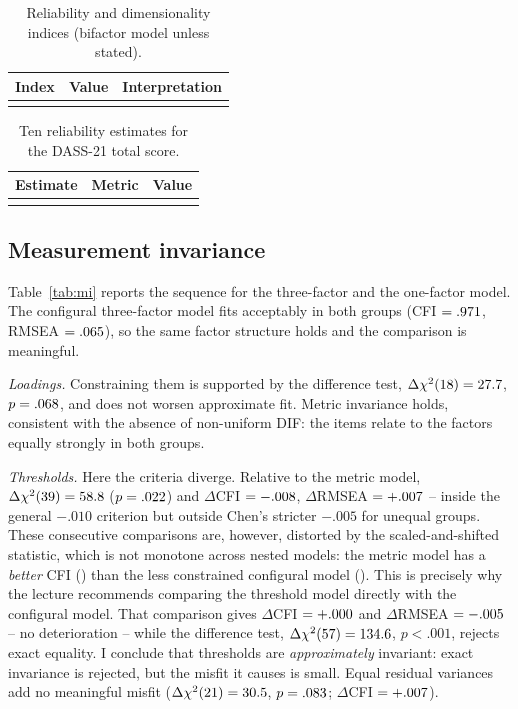 \documentclass[11pt,a4paper]{article}
\begin{document}
\begin{table}[t]
\centering\small
\caption{Reliability and dimensionality indices (bifactor model unless stated).}
\label{tab:dim}
\begin{tabular}{@{}p{6.9cm} l p{6.2cm}@{}}
\toprule
Index & Value & Interpretation\\
\midrule
\\
\bottomrule
\end{tabular}
\end{table}

\begin{table}[t]
\centering\small
\caption{Ten reliability estimates for the DASS-21 total score.}
\label{tab:omega}
\begin{tabular}{lll}
\toprule
Estimate & Metric & Value\\
\midrule
\\
\bottomrule
\end{tabular}
\end{table}

\subsection{Measurement invariance}\label{sec:mi}

Table~\ref{tab:mi} reports the sequence for the three-factor and the one-factor model.
The configural three-factor model fits acceptably in both groups (CFI $=.971$,
RMSEA $=.065$), so the same factor structure holds and the comparison is
meaningful.

\emph{Loadings.} Constraining them is supported by the difference test,
$\Delta\chi^2(18)=27.7$, $p=.068$, and does not worsen
approximate fit. Metric invariance holds, consistent with the absence of non-uniform DIF:
the items relate to the factors equally strongly in both groups.

\emph{Thresholds.} Here the criteria diverge. Relative to the metric model,
$\Delta\chi^2(39)=58.8$ ($p=.022$) and
$\Delta$CFI $=-.008$, $\Delta$RMSEA $=+.007$ -- inside the general
$-.010$ criterion but outside Chen's stricter $-.005$ for unequal groups. These
consecutive comparisons are, however, distorted by the scaled-and-shifted statistic,
which is not monotone across nested models: the metric model has a \emph{better} CFI
(\MIMetricCFI) than the less constrained configural model (\MIConfiguralCFI). This is
precisely why the lecture recommends comparing the threshold model directly with the
configural model. That comparison gives $\Delta$CFI $=+.000$ and
$\Delta$RMSEA $=-.005$ -- no deterioration -- while the difference test,
$\Delta\chi^2(57)=134.6$, $p<.001$, rejects exact equality. I
conclude that thresholds are \emph{approximately} invariant: exact invariance is
rejected, but the misfit it causes is small. Equal residual variances add no meaningful
misfit ($\Delta\chi^2(21)=30.5$, $p=.083$; $\Delta$CFI
$=+.007$).
\end{document}
